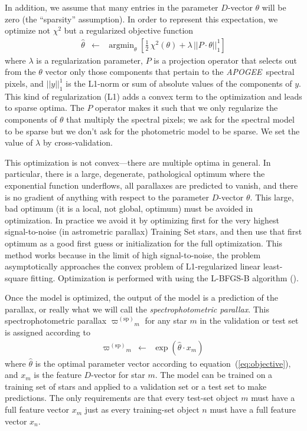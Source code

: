 \documentclass[modern]{aastex62}
\newcommand{\equationname}{equation}
\newcommand{\code}[1]{\texttt{\detokenize{#1}}}
\newcommand{\acronym}[1]{{\small{#1}}}
\newcommand{\project}[1]{\textsl{#1}}
\newcommand{\apogee}{\project{\acronym{APOGEE}}}
\DeclareMathOperator*{\argmin}{argmin}
\newcommand{\sparallax}{{\varpi^{(\mathrm{sp})}}}
\begin{document}
In addition, we assume that many entries in the parameter $D$-vector $\theta$ will be zero
(the ``sparsity'' assumption).
In order to represent this expectation,
we optimize not $\chi^2$ but a regularized objective function
\begin{eqnarray}
\hat{\theta} &\leftarrow& \argmin_{\theta}\left[\frac{1}{2}\,\chi^2(\theta) + \lambda\,||P\cdot\theta||_1^1\right]
\label{eq:objective}
\end{eqnarray}
where
$\lambda$ is a regularization parameter,
$P$ is a projection operator that selects out from the $\theta$ vector only those components
that pertain to the \apogee\ spectral pixels,
and $||y||_1^1$ is the L1-norm or sum of absolute values of the components of $y$.
This kind of regularization (L1) adds a convex term to the optimization and leads to
sparse optima.
The $P$ operator makes it such that we only regularize the components of $\theta$ that multiply
the spectral pixels; we ask for the spectral model to be sparse but we don't ask for the photometric
model to be sparse.
We set the value of $\lambda$ by cross-validation.

This optimization is not convex---there are multiple optima in general.
In particular, there is a large, degenerate, pathological optimum where
the exponential function underflows, all parallaxes are predicted to vanish,
and there is no gradient of anything with respect to the parameter $D$-vector $\theta$.
This large, bad optimum (it is a local, not global, optimum) must be avoided in optimization.
In practice we avoid it by optimizing first for the very highest signal-to-noise
(in astrometric parallax) Training Set stars, and then use that first optimum as a
good first guess or initialization for the full optimization.
This method works because in the limit of high signal-to-noise, the problem asymptotically approaches
the convex problem of L1-regularized linear least-square fitting.
Optimization is performed with \code{scipy.optimize} using the
\acronym{L-BFGS-B} algorithm (\citealt{lbfgsb}).

Once the model is optimized, the output of the model is a prediction of the parallax,
or really what we will call the \emph{spectrophotometric parallax}.
This spectrophotometric parallax
$\sparallax_m$ for any star $m$ in the validation or test set is
assigned according to
\begin{eqnarray}
\sparallax_m &\leftarrow& \exp(\hat{\theta}\cdot x_m)
\end{eqnarray}
where
$\hat{\theta}$ is the optimal parameter vector according
to \equationname~(\ref{eq:objective}),
and
$x_m$ is the feature $D$-vector for star $m$.
The model can be trained on a training set of stars and applied to
a validation set or a test set to make predictions.
The only requirements are that every test-set object $m$  must have a full feature
vector $x_m$ just as every training-set object $n$ must have a full feature
vector $x_n$.
\end{document}

